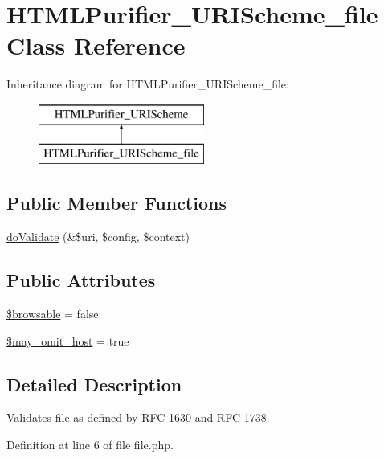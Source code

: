 \hypertarget{classHTMLPurifier__URIScheme__file}{\section{H\+T\+M\+L\+Purifier\+\_\+\+U\+R\+I\+Scheme\+\_\+file Class Reference}
\label{classHTMLPurifier__URIScheme__file}
}
Inheritance diagram for H\+T\+M\+L\+Purifier\+\_\+\+U\+R\+I\+Scheme\+\_\+file\+:\begin{figure}[H]
\begin{center}
\leavevmode
\includegraphics[height=2.000000cm]{classHTMLPurifier__URIScheme__file}
\end{center}
\end{figure}
\subsection*{Public Member Functions}
\begin{DoxyCompactItemize}
\item 
\hyperlink{classHTMLPurifier__URIScheme__file_a8a15a1176cee06a056081d165f915dc4}{do\+Validate} (\&\$uri, \$config, \$context)
\end{DoxyCompactItemize}
\subsection*{Public Attributes}
\begin{DoxyCompactItemize}
\item 
\hyperlink{classHTMLPurifier__URIScheme__file_acc57fbd70598b7d461937c7dae0da764}{\$browsable} = false
\item 
\hyperlink{classHTMLPurifier__URIScheme__file_ac62abc9c669a6e467ce2ce6cd9cbdcaa}{\$may\+\_\+omit\+\_\+host} = true
\end{DoxyCompactItemize}


\subsection{Detailed Description}
Validates file as defined by R\+F\+C 1630 and R\+F\+C 1738. 

Definition at line 6 of file file.\+php.



